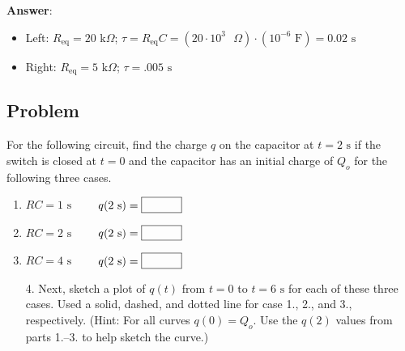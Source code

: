 \documentclass{article}
\begin{document}


\ifsolutions
\textbf{Answer}:

    \begin{itemize}

      \item Left: $R_{\text{eq}}=20\text{ k}\Omega$; $\tau = R_{\text{eq}}C = (20\cdot 10^3\text{ }\Omega) \cdot (10^{-6}\text{ F}) = 0.02\text{ s}$

      \item Right: $R_{\text{eq}}=5\text{ k}\Omega$; $\tau=.005\text{ s}$

    \end{itemize}
\else
\vskip 72pt
\fi
\ifsolutions\else
\vskip 72pt
\fi

\newpage

\subsection{Problem}

For the following circuit, find the charge $q$ on the capacitor at $t=2\text{ s}$ if the switch is closed at $t=0$ and the capacitor has an initial charge of $Q_o$ for the following three cases.

\begin{enumerate}

  \item $RC=1\text{ s}\qquad$ $q(2\text{ s})=\fbox{\qquad\phantom M}$

  \item $RC=2\text{ s}\qquad$ $q(2\text{ s})=\fbox{\qquad\phantom M}$

  \item $RC=4\text{ s}\qquad$ $q(2\text{ s})=\fbox{\qquad\phantom M}$

\end{enumerate}

\ifsolutions

\else
\vskip 56.25pt
\fi
\ifsolutions\else
\vskip 56.25pt
\fi

\begin{enumerate}

  \item[4.] Next, sketch a plot of $q(t)$ from $t=0$ to $t=6\text{ s}$ for each of these three cases. Used a solid, dashed, and dotted line for case 1., 2., and 3., respectively. (Hint: For all curves $q(0)=Q_o$. Use the $q(2)$ values from parts 1.--3. to help sketch the curve.)

\end{enumerate}
\end{document}
